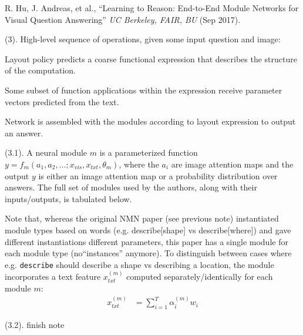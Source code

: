 \documentclass[11pt]{article}
\begin{document}

\vspace{-1em}
{\footnotesize R. Hu, J. Andreas, et al., ``Learning to Reason: End-to-End Module Networks for Visual Question Answering'' \textit{UC Berkeley, FAIR, BU} (Sep 2017).}

 (3). High-level sequence of operations, given some input question and image:
\begin{compactenum}
	\item Layout policy predicts a coarse functional expression that describes the structure of the computation.
	
	\item Some subset of function applications within the expression receive parameter vectors predicted from the text. 
	
	\item Network is assembled with the modules according to layout expression to output an answer. 
\end{compactenum}


 (3.1). A neural module $m$ is a parameterized function $y = f_m(a_1, a_2, \ldots; x_{vis}, x_{txt}, \theta_m)$, where the $a_i$ are image attention maps and the output $y$ is either an image attention map or a probability distribution over answers. The full set of modules used by the authors, along with their inputs/outputs, is tabulated below. 

Note that, whereas the original NMN paper (see previous note) instantiated module types based on words (e.g. describe[shape] vs describe[where]) and gave different instantiations different parameters, this paper has a single module for each module type (no``instances'' anymore). To distinguish between cases where e.g. \texttt{describe} should describe a shape vs describing a location, the module incorporates a text feature $x_{txt}^{(m)}$ computed separately/identically for each module $m$:
\begin{align}
x_{txt}^{(m)} &= \sum_{i=1}^T \alpha_i^{(m)} w_i
\end{align}

 (3.2).  finish note
\end{document}
